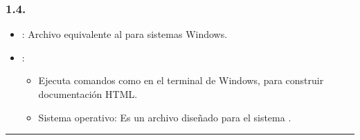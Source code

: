 \documentclass[a4paper,10pt,oneside,spanish,openany]{sphinxmanual}
\begin{document}
\subsubsection{1.4. }
\label{\detokenize{configuracion_inicial/004.estructura_inicial_proyecto:archivo-make-bat}}\begin{itemize}
\item {} 
\sphinxAtStartPar
{}: Archivo equivalente al  para sistemas Windows.

\item {} 
\sphinxAtStartPar
{}:
\begin{itemize}
\item {} 
\sphinxAtStartPar
Ejecuta comandos como  en el terminal de Windows, para construir documentación HTML.

\item {} 
\sphinxAtStartPar
Sistema operativo: Es un archivo diseñado para el sistema .

\end{itemize}

\end{itemize}


\bigskip\hrule\bigskip
\end{document}
